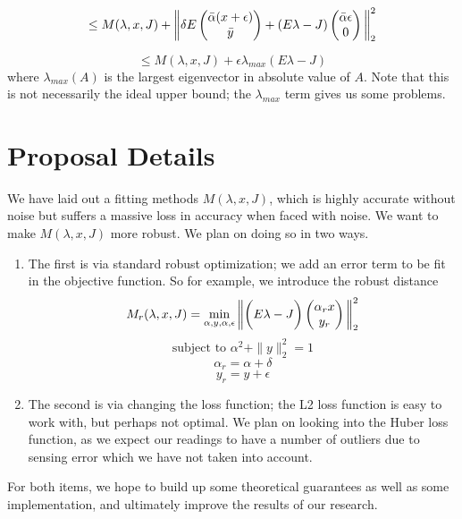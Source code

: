 $$\leq 
M(\lambda, x, J) + 
\bigg{\|} \delta E \begin{pmatrix}
\bar{\alpha} (x + \epsilon) \\
\bar{y}
\end{pmatrix} + (E {\lambda} - J )
\begin{pmatrix}
\bar{\alpha} \epsilon \\
0
\end{pmatrix}
\bigg{\|}_2^2
$$

$$ \leq M(\lambda, x, J) + \epsilon\lambda_{max}(E {\lambda} - J)$$ 
where $\lambda_{max}(A)$ is the largest eigenvector in absolute value of $A$. Note that this is not necessarily the ideal upper bound; the $\lambda_{max}$ term gives us some problems. 

\section{Proposal Details}
We have laid out a fitting methods $M(\lambda, x, J)$, which is highly accurate without noise but suffers a massive loss in accuracy when faced with noise. We want to make $M(\lambda, x, J)$ more robust. We plan on doing so in two ways. 
\begin{enumerate}
\item The first is via standard robust optimization; we add an error term to be fit in the objective function. So for example, we introduce the robust distance
\begin{equation}
M_r(\lambda, x, J) = \min_{\alpha, y, \alpha, \epsilon} \bigg{ \| } \bigg{(}E {\lambda} - J\bigg{)}
\begin{pmatrix}
\alpha_r x \\
y_r
\end{pmatrix}
     \bigg{ \| }_2^2
\end{equation}
$$ \text{subject to } \alpha^2 + \|y\|_2^2 = 1$$
$$ \alpha_r = \alpha + \delta$$
$$ y_r = y + \epsilon$$

\item The second is via changing the loss function; the L2 loss function is easy to work with, but perhaps not optimal. We plan on looking into the Huber loss function, as we expect our readings to have a number of outliers due to sensing error which we have not taken into account. 
\end{enumerate}
For both items, we hope to build up some theoretical guarantees as well as some implementation, and ultimately improve the results of our research.

